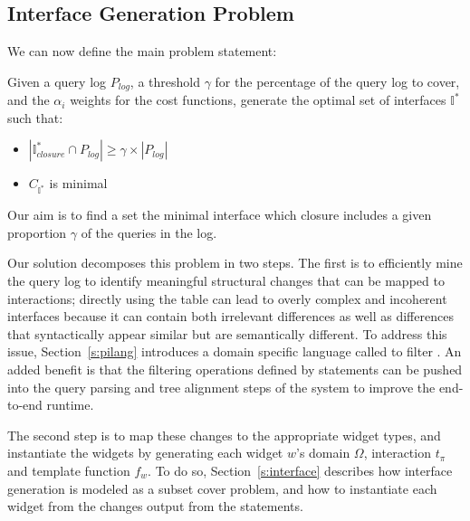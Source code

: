 \subsection{Interface Generation Problem}\label{s:problem}
We can now define the main problem statement:
\begin{problem}
  Given a query log $P_{log}$, a threshold $\gamma$ for the percentage of the query log to cover, and the $\alpha_i$ weights for the cost functions, generate the optimal set of interfaces $\mathbb{I}^*$ such that:
  \begin{itemize}[topsep=-1mm, itemsep=0mm]
  \item $|\mathbb{I}^*_{closure} \cap P_{log}| \ge \gamma \times |P_{log}|$
  \item $C_{\mathbb{I}^*}$ is minimal
  \end{itemize}
\end{problem}

Our aim is to find a set the minimal interface which closure includes a given proportion $\gamma$ of the queries in the log.

 Our solution decomposes this problem in two steps.  The first is to efficiently mine the query log to identify meaningful structural changes that can be mapped to interactions; directly using the table \difftable can lead to overly complex and incoherent interfaces because it can contain both irrelevant differences as well as differences that syntactically appear similar but are semantically different.  To address this issue,  Section~\ref{s:pilang} introduces a domain specific language called \lang to filter \difftable.  An added benefit is that the filtering operations defined by \lang statements can be pushed into the query parsing and tree alignment steps of the system to improve the end-to-end runtime.

The second step is to map these changes to the appropriate widget types, and instantiate the widgets by generating each widget $w$'s domain $\Omega$, interaction $t_\pi$ and template function $f_w$.  To do so, Section~\ref{s:interface} describes how interface generation is modeled as a subset cover problem, and how to instantiate each widget from the changes output from the \lang statements.





